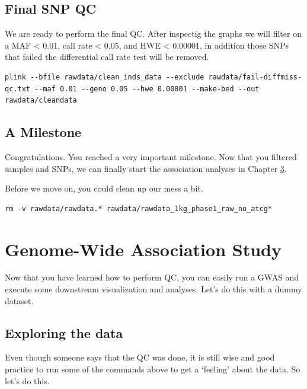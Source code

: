 \documentclass[
]{book}
\begin{document}
\hypertarget{final-snp-qc}{%
\section{Final SNP QC}\label{final-snp-qc}}

We are ready to perform the final QC. After inspectig the graphs we will filter on a MAF \textless{} 0.01, call rate \textless{} 0.05, and HWE \textless{} 0.00001, in addition those SNPs that failed the differential call rate test will be removed.

\begin{verbatim}
plink --bfile rawdata/clean_inds_data --exclude rawdata/fail-diffmiss-qc.txt --maf 0.01 --geno 0.05 --hwe 0.00001 --make-bed --out rawdata/cleandata
\end{verbatim}

\hypertarget{a-milestone}{%
\section{A Milestone}\label{a-milestone}}

Congratulations. You reached a very important milestone. Now that you filtered samples and SNPs, we can finally start the association analyses in Chapter \ref{gwas-testing}.

Before we move on, you could clean up our mess a bit.

\begin{verbatim}
rm -v rawdata/rawdata.* rawdata/rawdata_1kg_phase1_raw_no_atcg*
\end{verbatim}

\hypertarget{gwas-testing}{%
\chapter{Genome-Wide Association Study}\label{gwas-testing}}

Now that you have learned how to perform QC, you can easily run a GWAS and execute some downstream visualization and analyses. Let's do this with a dummy dataset.

\hypertarget{exploring-the-data}{%
\section{Exploring the data}\label{exploring-the-data}}

Even though someone says that the QC was done, it is still wise and good practice to run some of the commands above to get a `feeling' about the data. So let's do this.
\end{document}
